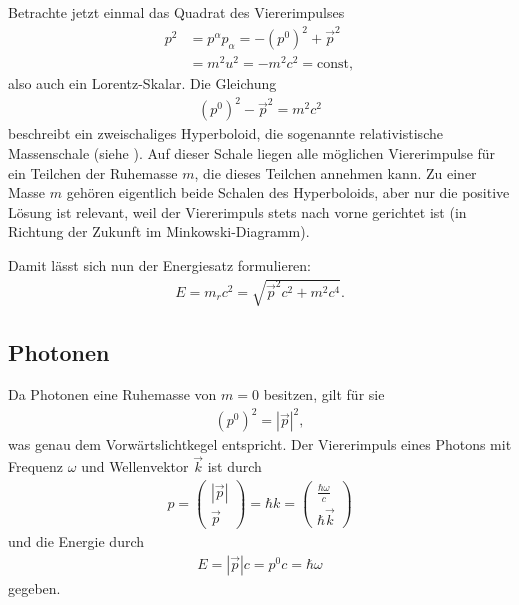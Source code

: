 Betrachte jetzt einmal das Quadrat des Viererimpulses
\begin{align*}
    p^2 & =p^\alpha p_\alpha=-\left(p^0\right)^2+\vec p^2 \\
        & =m^2 u^2 = -m^2 c^2 = \mathrm{const},
\end{align*}
also auch ein Lorentz-Skalar. Die Gleichung
\begin{align*}
    \left(p^0\right)^2-\vec p^2 = m^2 c^2
\end{align*}
beschreibt ein zweischaliges Hyperboloid, die sogenannte relativistische Massenschale (siehe ).
Auf dieser Schale liegen alle möglichen Viererimpulse für ein Teilchen der Ruhemasse $m$, die dieses Teilchen annehmen kann.
Zu einer Masse $m$ gehören eigentlich beide Schalen des Hyperboloids, aber nur die positive Lösung ist relevant, weil der Viererimpuls stets nach vorne gerichtet ist (in Richtung der Zukunft im Minkowski-Diagramm).

Damit lässt sich nun der Energiesatz formulieren:
\begin{align*}
    \boxed{E=m_r c^2=\sqrt{\vec p^2 c^2+m^2 c^4}.}
\end{align*}





\subsection{Photonen}

Da Photonen eine Ruhemasse von $m=0$ besitzen, gilt für sie
\begin{align*}
    \left(p^0\right)^2 = |\vec p|^2,
\end{align*}
was genau dem Vorwärtslichtkegel entspricht. Der Viererimpuls eines Photons mit Frequenz $\omega$ und Wellenvektor $\vec k$ ist durch
\begin{align}
    \label{eq:relativistischer_impuls_photon}
    p = \begin{pmatrix} |\vec p| \\ \vec p \end{pmatrix} = \hbar k = \begin{pmatrix} \frac{\hbar \omega}{c} \\ \hbar\vec k\end{pmatrix}
\end{align}
und die Energie durch
\begin{align}
    \label{eq:relativistische_energie_photon}
    E=|\vec p|c=p^0c=\hbar \omega
\end{align}
gegeben.

